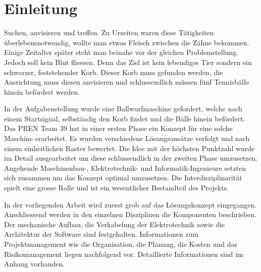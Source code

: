 \section{Einleitung}

Suchen, anvisieren und treffen. Zu Urzeiten waren diese Tätigkeiten überlebensnotwendig, wollte man etwas Fleisch zwischen die Zähne bekommen. Einige Zeitalter später steht man beinahe vor der gleichen Problemstellung. Jedoch soll kein Blut fliessen. Denn das Ziel ist kein lebendiges Tier sondern ein schwarzer, feststehender Korb. Dieser Korb muss gefunden werden, die Ausrichtung muss diesen anvisieren und schlussendlich müssen fünf Tennisbälle hinein befördert werden.

In der Aufgabenstellung wurde eine Ballwurfmaschine gefordert, welche nach einem Startsignal, selbständig den Korb findet und die Bälle hinein befördert. Das PREN Team 39 hat in einer ersten Phase ein Konzept für eine solche Maschine erarbeitet. Es wurden verschiedene Lösungsansätze verfolgt und nach einem einheitlichen Raster bewertet. Die Idee mit der höchsten Punktzahl wurde im Detail ausgearbeitet um diese schlussendlich in der zweiten Phase umzusetzen. Angehende Maschinenbau-, Elektrotechnik- und Informatik-Ingenieure setzten sich zusammen um das Konzept optimal umzusetzen. Die Interdisziplinarität spielt eine grosse Rolle und ist ein wesentlicher Bestandteil des Projekts.

In der vorliegenden Arbeit wird zuerst grob auf das Lösungskonzept eingegangen. Anschliessend werden in den einzelnen Disziplinen die Komponenten beschrieben. Der mechanische Aufbau, die Verkabelung der Elektrotechnik sowie die Architektur der Software sind festgehalten. Informationen zum Projektmanagement wie die Organisation, die Planung, die Kosten und das Risikomanagement liegen nachfolgend vor. Detaillierte Informationen sind im Anhang vorhanden.


